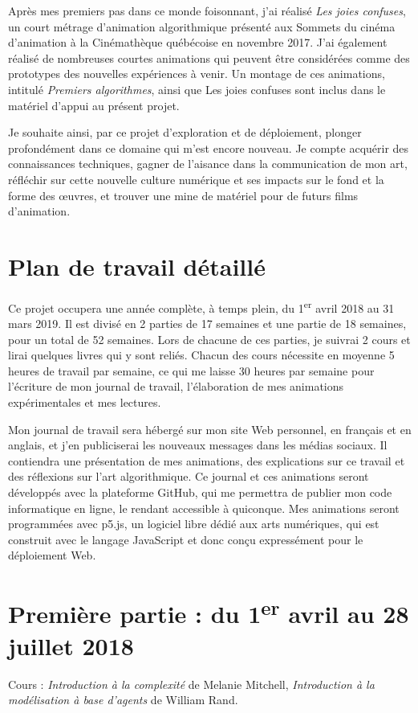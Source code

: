 \documentclass[12pt]{article}
\begin{document}
Après mes premiers pas dans ce monde foisonnant, j'ai réalisé \textit{Les joies confuses}, un court métrage d'animation algorithmique présenté aux Sommets du cinéma d'animation à la Cinémathèque québécoise en novembre 2017. J'ai également réalisé de nombreuses courtes animations qui peuvent être considérées comme des prototypes des nouvelles expériences à venir. Un montage de ces animations, intitulé \textit{Premiers algorithmes}, ainsi que Les joies confuses sont inclus dans le matériel d'appui au présent projet.

Je souhaite ainsi, par ce projet d'exploration et de déploiement, plonger profondément dans ce domaine qui m'est encore nouveau. Je compte acquérir des connaissances techniques, gagner de l'aisance dans la communication de mon art, réfléchir sur cette nouvelle culture numérique et ses impacts sur le fond et la forme des \oe{}uvres, et trouver une mine de matériel pour de futurs films d'animation.

\section{Plan de travail détaillé}
\noindent Ce projet occupera une année complète, à temps plein, du 1\textsuperscript{er} avril 2018 au 31 mars 2019. Il est divisé en 2 parties de 17 semaines et une partie de 18 semaines, pour un total de 52 semaines. Lors de chacune de ces parties, je suivrai 2 cours et lirai quelques livres qui y sont reliés. Chacun des cours nécessite en moyenne 5 heures de travail par semaine, ce qui me laisse 30 heures par semaine pour l'écriture de mon journal de travail, l'élaboration de mes animations expérimentales et mes lectures.

Mon journal de travail sera hébergé sur mon site Web personnel, en français et en anglais, et j'en publiciserai les nouveaux messages dans les médias sociaux. Il contiendra une présentation de mes animations, des explications sur ce travail et des réflexions sur l'art algorithmique. Ce journal et ces animations seront développés avec la plateforme GitHub, qui me permettra de publier mon code informatique en ligne, le rendant accessible à quiconque. Mes animations seront programmées avec p5.js, un logiciel libre dédié aux arts numériques, qui est construit avec le langage JavaScript et donc conçu expressément pour le déploiement Web.

\section{Première partie : du 1\textsuperscript{er} avril au 28 juillet 2018}
\noindent Cours : \textit{Introduction à la complexité} de Melanie Mitchell, \textit{Introduction à la modélisation à base d’agents} de William Rand.
\end{document}
